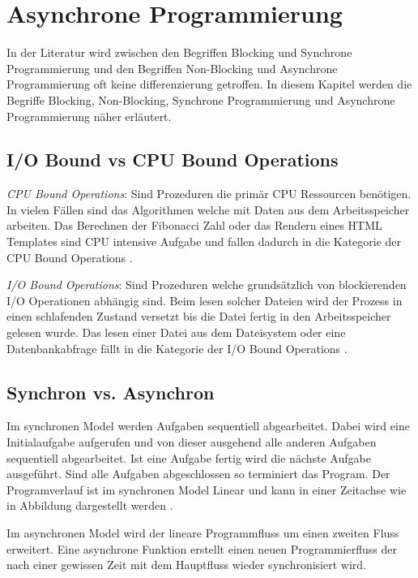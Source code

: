 \section{Asynchrone Programmierung}

In der Literatur wird zwischen den Begriffen Blocking und Synchrone Programmierung und den Begriffen Non-Blocking und Asynchrone Programmierung oft keine differenzierung getroffen. In diesem Kapitel werden die Begriffe Blocking, Non-Blocking, Synchrone Programmierung und Asynchrone Programmierung näher erläutert. 

\subsection{I/O Bound vs CPU Bound Operations}

\emph{CPU Bound Operations}: Sind Prozeduren die primär CPU Ressourcen benötigen. In vielen Fällen sind das Algorithmen welche mit Daten aus dem Arbeitsspeicher arbeiten. Das Berechnen der Fibonacci Zahl oder das Rendern eines HTML Templates sind CPU intensive Aufgabe und fallen dadurch in die Kategorie der CPU Bound Operations \cite[p. 70]{Erb2012}. 

\emph{I/O Bound Operations}: Sind Prozeduren welche grundsätzlich von blockierenden I/O Operationen abhängig sind. Beim lesen solcher Dateien wird der Prozess in einen schlafenden Zustand versetzt bis die Datei fertig in den Arbeitsspeicher gelesen wurde. Das lesen einer Datei aus dem Dateisystem oder eine Datenbankabfrage fällt in die Kategorie der I/O Bound Operations \cite[p. 70]{Erb2012}. 

\subsection{Synchron vs. Asynchron}

Im synchronen Model werden Aufgaben sequentiell abgearbeitet. Dabei wird eine Initialaufgabe aufgerufen und von dieser ausgehend alle anderen Aufgaben sequentiell abgearbeitet. Ist eine Aufgabe fertig wird die nächste Aufgabe ausgeführt. Sind alle Aufgaben abgeschlossen so terminiert das Program. Der Programverlauf ist im synchronen Model Linear und kann in einer Zeitachse wie in Abbildung dargestellt werden \cite[]{Pet2015}.

Im asynchronen Model wird der lineare Programmfluss um einen zweiten Fluss erweitert. Eine asynchrone Funktion erstellt einen neuen Programmierfluss der nach einer gewissen Zeit mit dem Hauptfluss wieder synchronisiert wird. 

